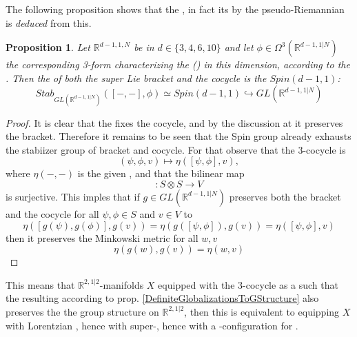 \documentclass[12pt,titlepage]{article}
\theoremstyle{plain}
\newtheorem{prop}{Proposition}
\theoremstyle{definition}
\theoremstyle{remark}
\begin{document}
The following proposition shows that the , in fact its  by the pseudo-Riemannian  is \emph{deduced} from this.
\begin{prop}
\label{StabilizerOfSupersymmetryJointWith3Cocycle}\hypertarget{StabilizerOfSupersymmetryJointWith3Cocycle}{}
Let $\mathbb{R}^{d-1,1,N}$ be  in  $d \in \{3,4,6,10\}$ and let $\phi \in \Omega^{3}(\mathbb{R}^{d-1,1|N})$ the corresponding 3-form characterizing the  () in this dimension, according to the  . Then the  of both the super Lie bracket and the cocycle is the  $Spin(d-1,1)$:
\begin{displaymath}
Stab_{GL(\mathbb{R}^{d-1,1|N})}([-,-], \phi)
\simeq
Spin(d-1,1) \hookrightarrow GL(\mathbb{R}^{d-1,1|N})
\end{displaymath}
\end{prop}
\begin{proof}
It is clear that the  fixes the cocycle, and by the discussion at  it preserves the bracket. Therefore it remains to be seen that the Spin group already exhausts the stabiizer group of bracket and cocycle. For that observe that the 3-cocycle is
\begin{displaymath}
(\psi,\phi, v) \mapsto \eta( [\psi,\phi], v )
,
\end{displaymath}
where $\eta(-,-)$ is the given , and that the bilinear map
\begin{displaymath}
[-,-]\colon S \otimes S\to V
\end{displaymath}
is surjective. This imples that if $g \in GL(\mathbb{R}^{d-1,1|N})$ preserves both the bracket and the cocycle for all $\psi, \phi \in S$ and $v \in V$ to
\begin{displaymath}
\eta( [g(\psi),g(\phi)], g(v) )
=
\eta( g([\psi,\phi]), g(v) )
=
\eta( [\psi,\phi], v )
\end{displaymath}
then it preserves the Minkowski metric for all $w,v$
\begin{displaymath}
\eta(g(w), g(v)) = \eta(w,v)
\end{displaymath}
\end{proof}
This means that $\mathbb{R}^{2,1|2}$-manifolds $X$ equipped with the 3-cocycle as a  such that the resulting  according to prop. \ref{DefiniteGlobalizationsToGStructure} also preserves the the group structure on $\mathbb{R}^{2,1|2}$, then this is equivalent to equipping $X$ with Lorentzian , hence with super-, hence with a -configuration for .
\end{document}
